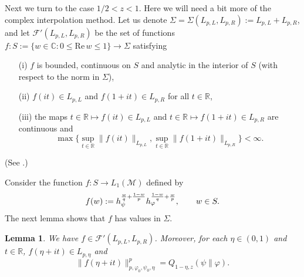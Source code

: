 \documentclass[12pt]{article}
\newtheorem{lemma}[theorem]{Lemma}
\theoremstyle{definition}
\theoremstyle{remark}
\numberwithin{equation}{section}
\def\Me{\mathcal M}
\def\cF{\mathcal{F}}
\def\ffi{\varphi}
\def\bR{\mathbb{R}}
\def\bC{\mathbb{C}}
\def\Re{\mathrm{Re}\,}
\begin{document}
\bigskip
Next we turn to the case $1/2<z<1$. Here we will need a bit more of the complex interpolation method.
Let us denote $\Sigma=\Sigma(L_{p,L},L_{p,R}):=L_{p,L}+L_{p,R}$, and let $\cF'(L_{p,L},L_{p,R})$ be
the set of functions $f:S:=\{w\in\bC:0\le\Re w\le1\}\to\Sigma$ satisfying
\begin{itemize}
\item[(i)] $f$ is bounded, continuous on $S$ and analytic in the interior of $S$ (with respect to the norm
in $\Sigma$),
\item[(ii)] $f(it)\in L_{p,L}$ and $f(1+it)\in L_{p,R}$ for all $t\in\bR$,
\item[(iii)] the maps $t\in\bR\mapsto f(it)\in L_{p,L}$ and $t\in\bR\mapsto f(1+it)\in L_{p,R}$ are continuous
and
\[
\max\biggl\{\sup_{t\in\bR}\|f(it)\|_{L_{p,L}},\sup_{t\in\bR}\|f(1+it)\|_{L_{p,R}}\biggr\}<\infty.
\]
\end{itemize}
(See \cite[Definition 1.4]{kosaki1984applications}.)

Consider the function $f:S\to L_1(\Me)$ defined by
\begin{align}\label{F-5.12}
f(w):=h_\psi^{{w\over q}+{1-w\over p}}h_\ffi^{{1-w\over q}+{w\over p}},\qquad w\in S.
\end{align}
The next lemma shows that $f$ has values in $\Sigma$.

\begin{lemma}\label{L-5.5}
We have $f\in\cF'(L_{p,L},L_{p,R})$. Moreover, for each $\eta\in(0,1)$ and $t\in\bR$,
$f(\eta+it)\in L_{p,\eta}$ and
\[
\|f(\eta+it)\|_{p,\ffi_0,\psi_0,\eta}^p=Q_{1-\eta,z}(\psi\|\ffi).
\]
\end{lemma}
\end{document}
